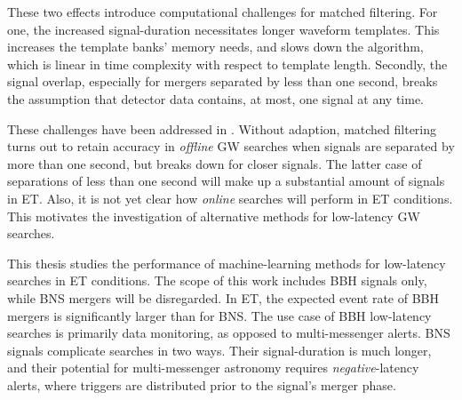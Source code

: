 These two effects introduce computational challenges for matched filtering. For one, the increased signal-duration necessitates longer waveform templates. This increases the template banks' memory needs, and slows down the algorithm, which is linear in time complexity with respect to template length. Secondly, the signal overlap, especially for mergers separated by less than one second, breaks the assumption that detector data contains, at most, one signal at any time. 

These challenges have been addressed in \cite{Relton_2022}. Without adaption, matched filtering turns out to retain accuracy in \emph{offline} GW searches when signals are separated by more than one second, but breaks down for closer signals. The latter case of separations of less than one second will make up a substantial amount of signals in ET. Also, it is not yet clear how \emph{online} searches will perform in ET conditions. This motivates the investigation of alternative methods for low-latency GW searches.


This thesis studies the performance of machine-learning methods for low-latency searches in ET conditions. The scope of this work includes BBH signals only, while BNS mergers will be disregarded. In ET, the expected event rate of BBH mergers is significantly larger than for BNS. The use case of BBH low-latency searches is primarily data monitoring, as opposed to multi-messenger alerts. BNS signals complicate searches in two ways. Their signal-duration is much longer, and their potential for multi-messenger astronomy requires \emph{negative}-latency alerts, where triggers are distributed prior to the signal's merger phase.